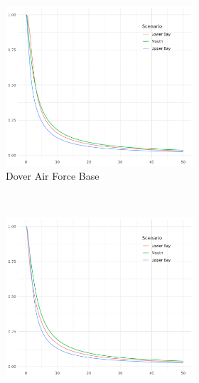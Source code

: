 \begin{figure}[ht]
\begin{figure}[htb]
    \begin{subfigure}[t]{0.31\textwidth}
        \centering
        \includegraphics[width=0.99\linewidth]{./plots/condsurv/doverafb}
        \caption{Dover Air Force Base\label{fig:condsurv1d:doverafb}}
    \end{subfigure}%
    ~ 
    \begin{subfigure}[t]{0.31\textwidth}
        \centering
        \includegraphics[width=0.99\linewidth]{./plots/condsurv/pia}

\end{subfigure}
\end{figure}
\end{figure}
